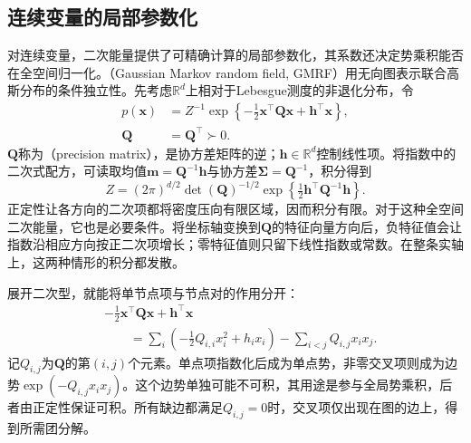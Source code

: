 \subsection{连续变量的局部参数化}
\label{sec:pgm-undirected-continuous-parameterization}

对连续变量，二次能量提供了可精确计算的局部参数化，其系数还决定势乘积能否在全空间归一化。（Gaussian Markov random field, GMRF）用无向图表示联合高斯分布的条件独立性。先考虑$\mathbb{R}^d$上相对于Lebesgue测度的非退化分布，令
\begin{equation}
  \begin{aligned}
    p(\bm{x})&=Z^{-1}
      \exp\left\{-\tfrac12\bm{x}^{\top}\bm{Q}\bm{x}
                   +\bm{h}^{\top}\bm{x}\right\},\\
    \bm{Q}&=\bm{Q}^{\top}\succ0.
  \end{aligned}
  \label{eq:pgm-undirected-gaussian}
\end{equation}
$\bm{Q}$称为（precision matrix），是协方差矩阵的逆；$\bm{h}\in\mathbb{R}^d$控制线性项。将指数中的二次式配方，可读取均值$\bm{m}=\bm{Q}^{-1}\bm{h}$与协方差$\bm{\Sigma}=\bm{Q}^{-1}$，积分得到
\begin{equation}
  Z=(2\pi)^{d/2}\det(\bm{Q})^{-1/2}
     \exp\left\{\tfrac12\bm{h}^{\top}\bm{Q}^{-1}\bm{h}\right\}.
  \label{eq:pgm-undirected-gaussian-partition}
\end{equation}
正定性让各方向的二次项都将密度压向有限区域，因而积分有限。对于这种全空间二次能量，它也是必要条件。将坐标轴变换到$\bm{Q}$的特征向量方向后，负特征值会让指数沿相应方向按正二次项增长；零特征值则只留下线性指数或常数。在整条实轴上，这两种情形的积分都发散。

展开二次型，就能将单节点项与节点对的作用分开：
\[
  \begin{aligned}
    &-\tfrac12\bm{x}^{\top}\bm{Q}\bm{x}+\bm{h}^{\top}\bm{x}\\
    &\qquad=\sum_i\left(-\tfrac12 Q_{i,i}x_i^2+h_i x_i\right)
             -\sum_{i<j}Q_{i,j}x_i x_j.
  \end{aligned}
\]
记$Q_{i,j}$为$\bm{Q}$的第$(i,j)$个元素。单点项指数化后成为单点势，非零交叉项则成为边势$\exp(-Q_{i,j}x_i x_j)$。这个边势单独可能不可积，其用途是参与全局势乘积，后者由正定性保证可积。所有缺边都满足$Q_{i,j}=0$时，交叉项仅出现在图的边上，得到所需团分解。

